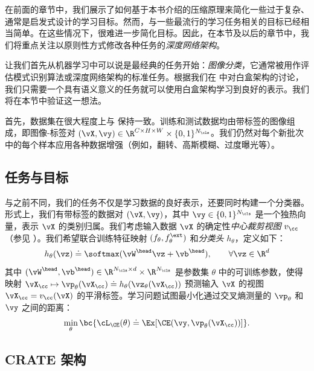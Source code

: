 \documentclass[../../book-main_zh.tex]{subfiles}
\begin{document}
在前面的章节中，我们展示了如何基于本书介绍的压缩原理来简化一些过于复杂、通常是启发式设计的学习目标。然而，与一些最流行的学习任务相关的目标已经相当简单。在这些情况下，很难进一步简化目标。因此，在本节及以后的章节中，我们将重点关注以原则性方式修改各种任务的\textit{深度网络架构}。

让我们首先从机器学习中可以说是最经典的任务开始：\textit{图像分类}，它通常被用作评估模式识别算法或深度网络架构的标准任务。根据我们在  中对白盒架构的讨论，我们只需要一个具有语义意义的任务就可以使用白盒架构学习到良好的表示。我们将在本节中验证这一想法。

首先，数据集在很大程度上与  保持一致。训练和测试数据均由带标签的图像组成，即图像-标签对 \((\vX, \vy) \in \R^{C \times H \times W} \times \{0, 1\}^{N_{\cls}}\)。我们仍然对每个新批次中的每个样本应用各种数据增强（例如，翻转、高斯模糊、过度曝光等）。

\subsection{任务与目标} \label{sub:image_classification_objective}

与之前不同，我们的任务不仅是学习数据的良好表示，还要同时构建一个分类器。形式上，我们有带标签的数据对 \((\vX, \vy)\)，其中 \(\vy \in \{0, 1\}^{N_{\cls}}\) 是一个独热向量，表示 \(\vX\) 的类别归属。我们考虑输入数据 \(\vX\) 的确定性\textit{中心裁剪视图} \(v_{\cc}\)（参见 ）。我们希望联合训练特征映射 \((f_{\theta}, f_{\theta}^{\ext})\) 和\textit{分类头} \(h_{\theta}\)，定义如下：
\begin{equation}
h_{\theta}(\vz) \doteq \softmax(\vW^{\head}\vz + \vb^{\head}), \qquad
\forall \vz \in \R^{d}
\end{equation}
其中 \((\vW^{\head}, \vb^{\head}) \in \R^{N_{\cls} \times d} \times
\R^{N_{\cls}}\) 是参数集 \(\theta\) 中的可训练参数，使得映射 \(\vX_{\cc} \mapsto
\vp_{\theta}(\vX_{\cc}) \doteq h_{\theta}(\vz_{\theta}(\vX_{\cc}))\)
预测输入 \(\vX\) 的视图 \(\vX_{\cc} = v_{\cc}(\vX)\) 的平滑标签。学习问题试图最小化通过交叉熵测量的 \(\vp_{\theta}\) 和 \(\vy\) 之间的距离：
\begin{equation}\label{eq:classification_ce_loss}
\min_{\theta}\bc{\cL_{\CE}(\theta) \doteq \Ex[\CE(\vy,
\vp_{\theta}(\vX_{\cc}))]}.
\end{equation}

\subsection{CRATE 架构}\label{sub:image_classification_architecture}
\end{document}
